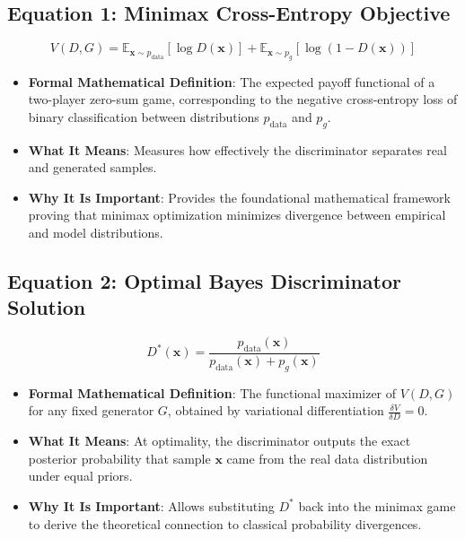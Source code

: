 \documentclass[11pt,a4paper]{article}
\theoremstyle{definition}
\begin{document}
\subsection{\textbf{Equation 1: Minimax Cross-Entropy Objective}}
{\boldmath
\begin{equation}
V(D, G) = \mathbb{E}_{\mathbf{x} \sim p_{\text{data}}}[\log D(\mathbf{x})] + \mathbb{E}_{\mathbf{x} \sim p_g}[\log(1 - D(\mathbf{x}))]
\end{equation}
}
\begin{itemize}
    \item \textbf{Formal Mathematical Definition}:
    The expected payoff functional of a two-player zero-sum game, corresponding to the negative cross-entropy loss of binary classification between distributions $p_{\text{data}}$ and $p_g$.
    \item \textbf{What It Means}:
    Measures how effectively the discriminator separates real and generated samples.
    \item \textbf{Why It Is Important}:
    Provides the foundational mathematical framework proving that minimax optimization minimizes divergence between empirical and model distributions.
\end{itemize}

\subsection{\textbf{Equation 2: Optimal Bayes Discriminator Solution}}
{\boldmath
\begin{equation}
D^*(\mathbf{x}) = \frac{p_{\text{data}}(\mathbf{x})}{p_{\text{data}}(\mathbf{x}) + p_g(\mathbf{x})}
\end{equation}
}
\begin{itemize}
    \item \textbf{Formal Mathematical Definition}:
    The functional maximizer of $V(D, G)$ for any fixed generator $G$, obtained by variational differentiation $\frac{\delta V}{\delta D} = 0$.
    \item \textbf{What It Means}:
    At optimality, the discriminator outputs the exact posterior probability that sample $\mathbf{x}$ came from the real data distribution under equal priors.
    \item \textbf{Why It Is Important}:
    Allows substituting $D^*$ back into the minimax game to derive the theoretical connection to classical probability divergences.
\end{itemize}
\end{document}
